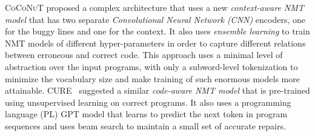 %
\textsc{CoCoNuT} \citep{Lutellier2020} proposed a complex architecture that uses
a new \emph{context-aware NMT model} that has two separate \emph{Convolutional
Neural Network (CNN)} encoders, one for the buggy lines and one for the context.
It also uses \emph{ensemble learning} to train NMT models of different
hyper-parameters in order to capture different relations between erroneous and
correct code. This approach uses a minimal level of abstraction over the input
programs, with only a subword-level tokenization to minimize the vocabulary size
and make training of such enormous models more attainable.
%
\textsc{CURE}~\citep{Jiang_2021}
suggested a similar \emph{code-aware NMT model} that is
pre-trained using unsupervised learning on correct programs. It also uses a
programming language (PL) \textsc{GPT} \citep{GPT2020} model that learns to
predict the next token in program sequences and uses beam search to maintain a
small set of accurate repairs.
